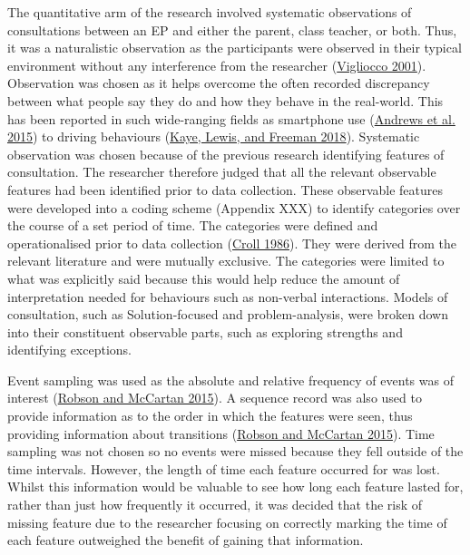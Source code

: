 \documentclass[
]{article}
\begin{document}
The quantitative arm of the research involved systematic observations of
consultations between an EP and either the parent, class teacher, or
both. Thus, it was a naturalistic observation as the participants were
observed in their typical environment without any interference from the
researcher
(\protect\hyperlink{ref-viglioccoTipofthetonguePsychology2001}{Vigliocco
2001}). Observation was chosen as it helps overcome the often recorded
discrepancy between what people say they do and how they behave in the
real-world. This has been reported in such wide-ranging fields as
smartphone use
(\protect\hyperlink{ref-andrewsSelfReportToolsCompare2015a}{Andrews et
al. 2015}) to driving behaviours
(\protect\hyperlink{ref-kayeComparisonSelfreportObjective2018}{Kaye,
Lewis, and Freeman 2018}). Systematic observation was chosen because of
the previous research identifying features of consultation. The
researcher therefore judged that all the relevant observable features
had been identified prior to data collection. These observable features
were developed into a coding scheme (Appendix XXX) to identify
categories over the course of a set period of time. The categories were
defined and operationalised prior to data collection
(\protect\hyperlink{ref-crollSystematicClassroomObservation1986}{Croll
1986}). They were derived from the relevant literature and were mutually
exclusive. The categories were limited to what was explicitly said
because this would help reduce the amount of interpretation needed for
behaviours such as non-verbal interactions. Models of consultation, such
as Solution-focused and problem-analysis, were broken down into their
constituent observable parts, such as exploring strengths and
identifying exceptions.

Event sampling was used as the absolute and relative frequency of events
was of interest
(\protect\hyperlink{ref-robsonRealWorldResearch2015}{Robson and McCartan
2015}). A sequence record was also used to provide information as to the
order in which the features were seen, thus providing information about
transitions (\protect\hyperlink{ref-robsonRealWorldResearch2015}{Robson
and McCartan 2015}). Time sampling was not chosen so no events were
missed because they fell outside of the time intervals. However, the
length of time each feature occurred for was lost. Whilst this
information would be valuable to see how long each feature lasted for,
rather than just how frequently it occurred, it was decided that the
risk of missing feature due to the researcher focusing on correctly
marking the time of each feature outweighed the benefit of gaining that
information.
\end{document}
